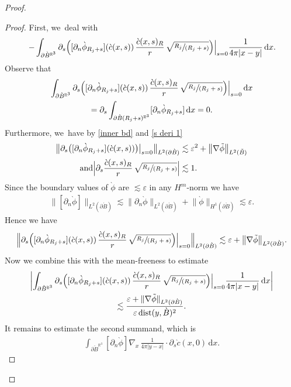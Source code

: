 \documentclass[JEP,XML,SOM,Unicode,published]{cedram}
\let\epsilon\varepsilon
\newcommand{\spfrac}[2]{\sfrac{#1}{(#2)}}
\theoremstyle{definition}
\DeclareMathOperator{\dist}{dist}
\newcommand\R{\mathbb{R}}
\newcommand\anorm[1]{\lVert #1\rVert}
\newcommand\bnorm[1]{\bigl\lVert #1\bigr\rVert}
\newcommand\Bnorm[1]{\Bigl\lVert #1\Bigr\rVert}
\newcommand\eq{=}
\newcommand\dd{\,\mathrm{d}}
\newcommand\dx{\dd x}
\let\de\partial
\let\eps\epsilon
\begin{document}
\begin{proof}
\begin{proof}
First, we~deal with
\begin{align*}
-\int_{\de\grave{B}^{\R^3}}\de_s\Bigl([\de_n\grave{\phi}_{R_j+s}](\grave{c}(x,s))\,\frac{\grave{c}(x,s)_R}{r}\,\sqrt{\spfrac{R_j}{R_j+s}} \Bigr) \Big|_{s=0}\frac{1}{4\pi|x-y|}\dx.
\end{align*}
Observe that
\begin{multline*}
\int_{\de\grave{B}^{\R^3}}\de_s \Bigl([\de_n\grave{\phi}_{R_j+s}](\grave{c}(x,s))\,\frac{\grave{c}(x,s)_R}{r}\,\sqrt{\spfrac{R_j}{R_j+s}} \Bigr) \Big|_{s=0}\dx\\
= \de_s \int_{\de\grave{B}(R_j+s)^{\R^3}}[\de_n\grave{\phi}_{R_j+s}]\dx\eq 0.
\end{multline*}
Furthermore, we~have by \eqref{inner bd} and \eqref{s deri 1}
\begin{align*}
\bnorm{\de_s\bigl([\de_n\grave{\phi}_{R_j+s}](\grave{c}(x,s))\bigr)\big|_{s=0}}_{L^2(\de\grave{B})}&\lesssim \eps^2+\bnorm{\nabla\tilde{\phi}}_{L^2(\tilde{B})}\\
\tag*{and}
\Bigl|\de_s\frac{\grave{c}(x,s)_R}{r}\,\sqrt{\spfrac{R_j}{R_j+s}} \Bigr|&\lesssim 1.
\end{align*}
Since the boundary values of $\grave{\phi}$ are $\lesssim \eps$ in any $H^m$-norm we have
\begin{align}
\bnorm{[\de_n\grave{\phi}]}_{L^2(\de\grave{B})}\lesssim \bnorm{\de_n\grave{\phi}}_{L^2(\de\grave{B})}+\bnorm{\grave{\phi}}_{H^1(\de\grave{B})}\lesssim \eps.\label{est jump}
\end{align}
Hence we have
\begin{align*}
\Bnorm{\de_s \Bigl([\de_n\grave{\phi}_{R_j+s}](\grave{c}(x,s))\,\frac{\grave{c}(x,s)_R}{r}\,\sqrt{\spfrac{R_j}{R_j+s}} \Bigr) \Big|_{s=0}}_{L^2(\de\grave{B})}\lesssim \eps+\bnorm{\nabla\tilde{\phi}}_{L^2(\de\grave{B})}.
\end{align*}
Now we combine this with the mean-freeness to estimate
\begin{multline*}
\biggl|\int_{\de\grave{B}^{\R^3}}\de_s \Bigl([\de_n\grave{\phi}_{R_j+s}](\grave{c}(x,s))\,\frac{\grave{c}(x,s)_R}{r}\,\sqrt{\spfrac{R_j}{R_j+s}} \Bigr) \Big|_{s=0}\frac{1}{4\pi|x-y|}\dx\biggr|\\
\lesssim \frac{\eps+\anorm{\nabla\tilde{\phi}}_{L^2(\de\grave{B})}}{\eps\dist(y,\grave{B})^2}.
\end{multline*}
It remains to estimate the second summand, which is
\begin{align*}
\int_{\de\grave{B}^{\R^3}}[\de_n\grave{\phi}]\nabla_x\,\frac{1}{4\pi|y-x|}\cdot \de_s\grave{c}(x,0)\dx.

\end{align*}
\end{proof}
\end{proof}
\end{document}
